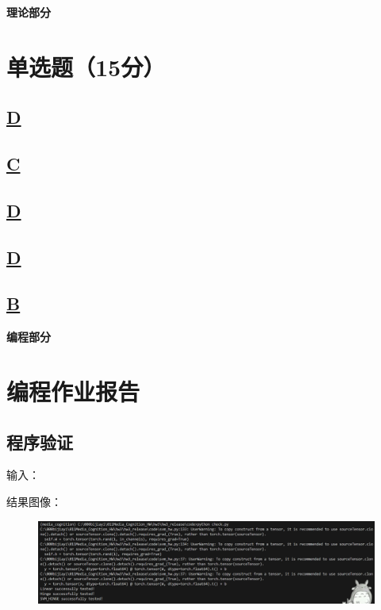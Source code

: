 \documentclass[a4paper]{article}
\begin{document}
\courseheader
\vspace{3mm}
\centerline{\textbf{\Large{理论部分}}}

\section{单选题（15分）}
\subsection{\underline{D}}

\subsection{\underline{C}}

\subsection{\underline{D}}

\subsection{\underline{D}}

\subsection{\underline{B}}
\clearpage




\vspace{3mm}
\centerline{\textbf{\Large{编程部分}}}
\section{编程作业报告}
\subsection{程序验证}
输入：

结果图像：
\begin{figure}[H]
    \centering
    \includegraphics[width=0.9\linewidth]{../../img/checkSVM-result.png}
\end{figure}
\end{document}
